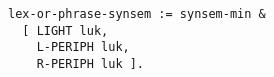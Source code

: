\documentclass[a4paper]{article}
\begin{document}
{\small\begin{verbatim}
lex-or-phrase-synsem := synsem-min &
  [ LIGHT luk,
    L-PERIPH luk,
    R-PERIPH luk ].
\end{verbatim}}
\end{document}
